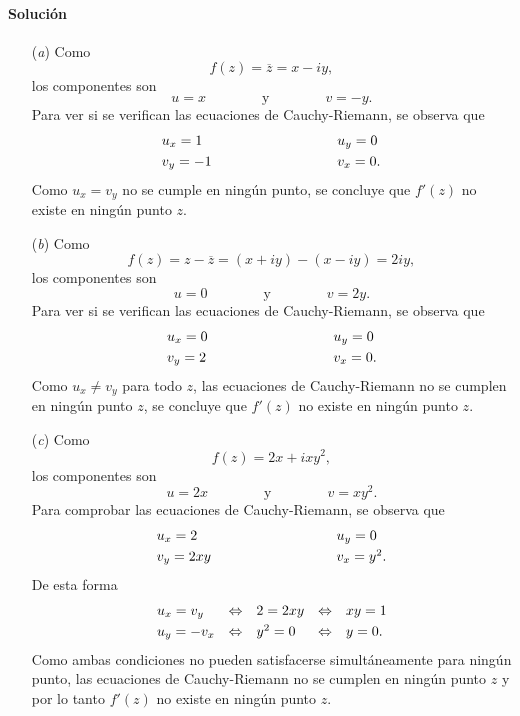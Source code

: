 \documentclass[a4paper]{report}
\begin{document}
\paragraph{Solución} 

\begin{enumerate}
 \item[(\textit{a})] Como
 \[
  f(z)=\overline{z}=x-iy,
 \]
 los componentes son 
 \[
  u=x
  \qquad\qquad\textrm{y}\qquad\qquad
  v=-y.
 \]
 Para ver si se verifican las ecuaciones de Cauchy-Riemann, se observa que 
 \[
 \begin{array}{ll}
  u_x=1\qquad\qquad\qquad\qquad&u_y=0\\[\smallskipamount]
  v_y=-1\qquad\qquad\qquad\qquad&v_x=0.
 \end{array}
 \]
 Como \(u_x=v_y\) no se cumple en ningún punto, se concluye que \(f'(z)\) no existe en ningún punto \(z\).
 \item[(\textit{b})] Como
 \[
  f(z)=z-\overline{z}=(x+iy)-(x-iy)=2iy,
 \]
 los componentes son 
 \[
  u=0
  \qquad\qquad\textrm{y}\qquad\qquad
  v=2y.
 \]
 Para ver si se verifican las ecuaciones de Cauchy-Riemann, se observa que 
 \[
 \begin{array}{ll}
  u_x=0\qquad\qquad\qquad\qquad&u_y=0\\[\smallskipamount]
  v_y=2\qquad\qquad\qquad\qquad&v_x=0.
 \end{array}
 \]
 Como \(u_x\neq v_y\) para todo \(z\), las ecuaciones de Cauchy-Riemann no se cumplen en ningún punto \(z\), se concluye que \(f'(z)\) no existe en ningún punto \(z\).
 \item[(\textit{c})] Como
 \[
  f(z)=2x+ixy^2,
 \]
 los componentes son 
 \[
  u=2x
  \qquad\qquad\textrm{y}\qquad\qquad
  v=xy^2.
 \]
 Para comprobar las ecuaciones de Cauchy-Riemann, se observa que 
 \[
 \begin{array}{ll}
  u_x=2\qquad\qquad\qquad\qquad&u_y=0\\[\smallskipamount]
  v_y=2xy\qquad\qquad\qquad\qquad&v_x=y^2.
 \end{array}
 \]
 De esta forma
 \[
 \begin{array}{lllll}
  u_x=v_y&\Leftrightarrow&2=2xy&\Leftrightarrow&xy=1\\[\smallskipamount]
  u_y=-v_x&\Leftrightarrow&y^2=0&\Leftrightarrow&y=0.
 \end{array}
 \] 
 Como ambas condiciones no pueden satisfacerse simultáneamente para ningún punto, las ecuaciones de Cauchy-Riemann no se cumplen en ningún punto \(z\) y por lo tanto \(f'(z)\) no existe en ningún punto \(z\).

\end{enumerate}
\end{document}
